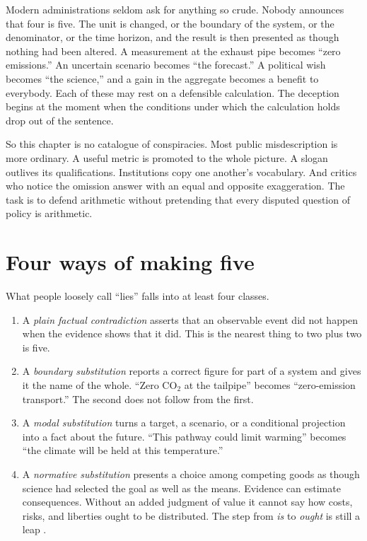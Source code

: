 \documentclass[12pt,a4paper]{book}
\begin{document}
Modern administrations seldom ask for anything so crude. Nobody announces that four is five. The unit is changed, or the boundary of the system, or the denominator, or the time horizon, and the result is then presented as though nothing had been altered. A measurement at the exhaust pipe becomes ``zero emissions.'' An uncertain scenario becomes ``the forecast.'' A political wish becomes ``the science,'' and a gain in the aggregate becomes a benefit to everybody. Each of these may rest on a defensible calculation. The deception begins at the moment when the conditions under which the calculation holds drop out of the sentence.

So this chapter is no catalogue of conspiracies. Most public misdescription is more ordinary. A useful metric is promoted to the whole picture. A slogan outlives its qualifications. Institutions copy one another's vocabulary. And critics who notice the omission answer with an equal and opposite exaggeration. The task is to defend arithmetic without pretending that every disputed question of policy is arithmetic.

\section{Four ways of making five}

What people loosely call ``lies'' falls into at least four classes.

\begin{enumerate}
\item A \emph{plain factual contradiction} asserts that an observable event did not happen when the evidence shows that it did. This is the nearest thing to two plus two is five.

\item A \emph{boundary substitution} reports a correct figure for part of a system and gives it the name of the whole. ``Zero CO$_2$ at the tailpipe'' becomes ``zero-emission transport.'' The second does not follow from the first.

\item A \emph{modal substitution} turns a target, a scenario, or a conditional projection into a fact about the future. ``This pathway could limit warming'' becomes ``the climate will be held at this temperature.''

\item A \emph{normative substitution} presents a choice among competing goods as though science had selected the goal as well as the means. Evidence can estimate consequences. Without an added judgment of value it cannot say how costs, risks, and liberties ought to be distributed. The step from \emph{is} to \emph{ought} is still a leap \cite[Book~III, Part~I, sec.~1]{Hume-Treatise}.
\end{enumerate}
\end{document}
